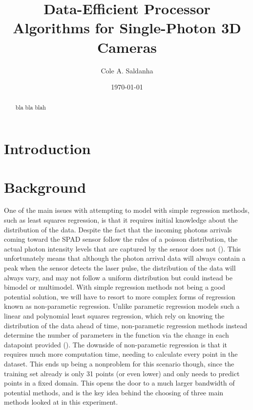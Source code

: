 \documentclass[letterpaper,12pt]{article}
\title{Data-Efficient Processor Algorithms for Single-Photon 3D Cameras}
\author{Cole A. Saldanha}
\date{\today}
\begin{document}
\maketitle

\begin{abstract}
bla bla blah
\end{abstract}

\section{Introduction}

\section{Background}

One of the main issues with attempting to model with simple regression methods, such as 
least squares regression, is that it requires initial knowledge about the distribution of
the data. Despite the fact that the incoming photons arrivals coming toward the SPAD sensor 
follow the rules of a poisson distribution, the actual photon intensity levels that are captured 
by the sensor does not (\cite{ingle2019high}). This unfortunately means that although the 
photon arrival data will always contain a peak when the sensor detects the laser pulse, the
distribution of the data will always vary, and may not follow a uniform distribution but
could instead be bimodel or multimodel. With simple regression methods not being a good 
potential solution, we will have to resort to more complex forms of regression known
as non-parametic regression. Unlike parametic regression models such a linear and polynomial
least squares regression, which rely on knowing the distribution of the data ahead of time,
non-parametic regression methods instead determine the number of parameters in the function
via the change in each datapoint provided (\cite{mahoud2019parametic}). The downside of 
non-parametic regression is that it requires much more computation time, needing to calculate
every point in the dataset. This ends up being a nonproblem for this scenario though,
since the training set already is only 31 points (or even lower) and only needs to predict
points in a fixed domain. This opens the door to a much larger bandwidth of potential methods, 
and is the key idea behind the choosing of three main methods looked at in this experiment.
\end{document}

